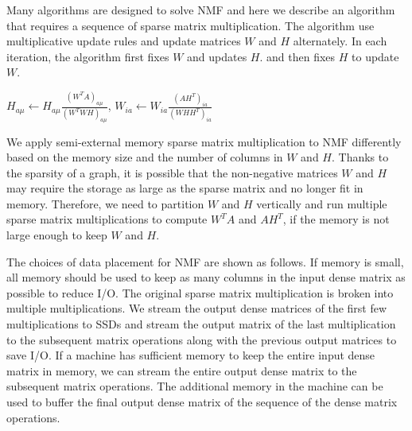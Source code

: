 Many algorithms are designed to solve NMF and here we describe an algorithm
\cite{nmf} that requires a sequence of sparse matrix multiplication.
The algorithm use multiplicative update rules and update matrices $W$ and $H$
alternately. In each iteration, the algorithm first fixes $W$ and updates $H$.
and then fixes $H$ to update $W$.

$H_{a\mu} \leftarrow H_{a\mu} \frac{{(W^TA)}_{a\mu}}{{(W^TWH)}_{a\mu}}$,
$W_{ia} \leftarrow W_{ia} \frac{{(AH^T)}_{ia}}{{(WHH^T)}_{ia}}$

We apply semi-external memory sparse matrix multiplication to NMF differently
based on the memory size and the number of columns in $W$ and $H$. Thanks to
the sparsity of a graph, it is possible that the non-negative matrices $W$ and
$H$ may require the storage as large as the sparse matrix and no longer fit in
memory. Therefore, we need to partition $W$ and $H$ vertically and run multiple
sparse matrix multiplications to compute $W^TA$ and $AH^T$, if the memory is not
large enough to keep $W$ and $H$.

The choices of data placement for NMF are
shown as follows. If memory is small, all memory should be used to keep as many
columns in the input dense matrix as possible to reduce I/O. The original sparse
matrix multiplication is broken into multiple multiplications. We stream the output
dense matrices of the first few multiplications to SSDs and stream the output matrix
of the last multiplication to the subsequent matrix operations along with
the previous output matrices to save I/O.
If a machine has sufficient memory to keep the entire input dense matrix in memory,
we can stream the entire output dense matrix to the subsequent matrix operations.
The additional memory in the machine can be used to buffer the final output
dense matrix of the sequence of the dense matrix operations.
